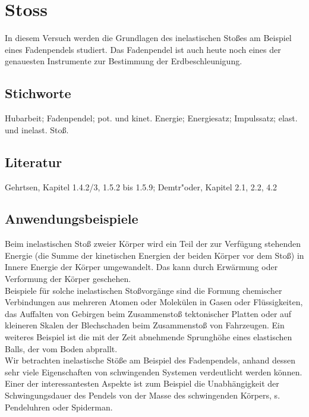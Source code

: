 \chapter{Stoss}
\label{v:1}


In diesem Versuch werden die Grundlagen des inelastischen Sto{\ss}es am Beispiel eines Fadenpendels studiert. Das Fadenpendel ist auch heute noch eines der genauesten Instrumente zur Bestimmung der Erdbeschleunigung.


\section{Stichworte}
Hubarbeit; Fadenpendel; pot. und kinet. Energie; Energiesatz; Impulssatz; elast. und inelast. Sto{\ss}.
%
\section{Literatur}
Gehrtsen, Kapitel 1.4.2/3, 1.5.2 bis 1.5.9; Demtr"oder, Kapitel 2.1, 2.2, 4.2
%
\section{Anwendungsbeispiele}
%
Beim inelastischen Stoß zweier Körper wird ein Teil der zur Verfügung stehenden Energie (die Summe der kinetischen Energien der beiden Körper vor dem Stoß) in Innere Energie der Körper umgewandelt. Das kann durch Erwärmung oder Verformung der Körper geschehen.\\
Beispiele für solche inelastischen Stoßvorgänge sind die Formung chemischer Verbindungen aus mehreren Atomen oder Molekülen in Gasen oder Flüssigkeiten, das Auffalten von Gebirgen beim Zusammenstoß tektonischer Platten oder auf kleineren Skalen der Blechschaden beim Zusammenstoß von Fahrzeugen. Ein weiteres Beispiel ist die mit der Zeit abnehmende Sprunghöhe eines elastischen Balls, der vom Boden abprallt.\\
Wir betrachten inelastische Stöße am Beispiel des Fadenpendels, anhand dessen sehr viele Eigenschaften von schwingenden Systemen verdeutlicht werden können. Einer der interessantesten Aspekte ist zum Beispiel die Unabhängigkeit der Schwingungsdauer des Pendels von der Masse des schwingenden Körpers, s. Pendeluhren oder Spiderman.\\

